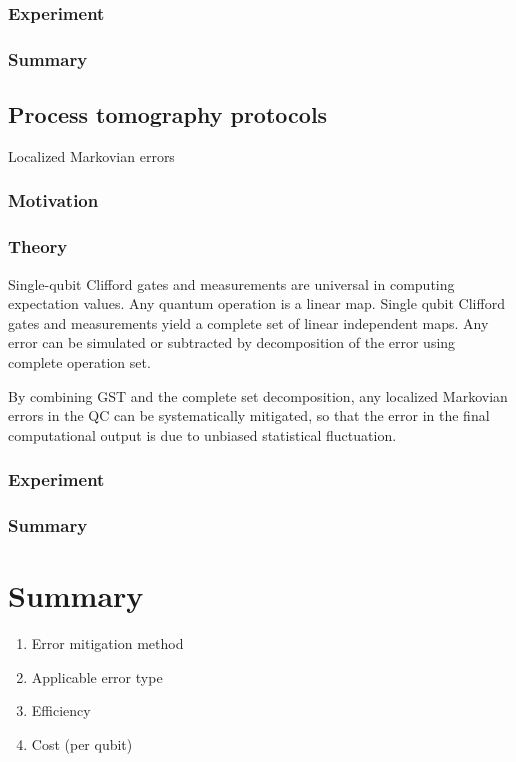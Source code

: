 \documentclass[11pt, oneside]{article}   	%
\begin{document}
\subsubsection{Experiment}
\subsubsection{Summary}

\subsection{Process tomography protocols}
Localized Markovian errors
\subsubsection{Motivation}
\subsubsection{Theory}
Single-qubit Clifford gates and measurements are universal in  computing expectation values.
Any quantum operation is a linear map.
Single qubit Clifford gates and measurements yield a complete set of linear independent maps.
Any error can be simulated or subtracted by decomposition of the error using complete operation set.

By combining GST and the complete set decomposition, any localized Markovian errors in the QC can be systematically mitigated, 
so that the error in the final computational output is due to unbiased statistical fluctuation.

\subsubsection{Experiment}
\subsubsection{Summary}

\section{Summary}
\begin{enumerate}
\item {Error mitigation method}
\item {Applicable error type}
\item {Efficiency}
\item {Cost (per qubit)}
\end{enumerate}
\end{document}
